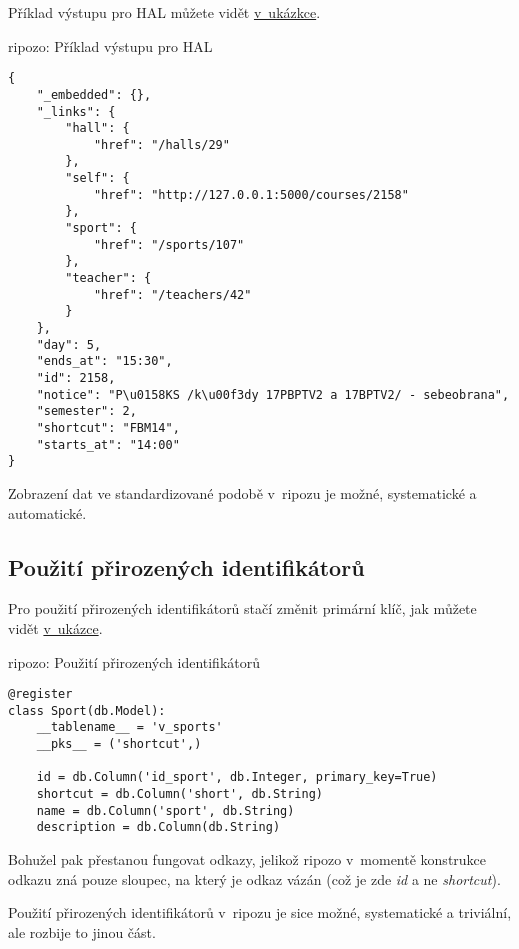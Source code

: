 Příklad výstupu pro HAL můžete vidět \protect\hyperlink{code:ripozo:hal}{v~ukázkce}.

\begin{listing}[htbp]
\caption{{\label{code:ripozo:hal}ripozo: Příklad výstupu pro HAL}}
\begin{verbatim}
{
    "_embedded": {},
    "_links": {
        "hall": {
            "href": "/halls/29"
        },
        "self": {
            "href": "http://127.0.0.1:5000/courses/2158"
        },
        "sport": {
            "href": "/sports/107"
        },
        "teacher": {
            "href": "/teachers/42"
        }
    },
    "day": 5,
    "ends_at": "15:30",
    "id": 2158,
    "notice": "P\u0158KS /k\u00f3dy 17PBPTV2 a 17BPTV2/ - sebeobrana",
    "semester": 2,
    "shortcut": "FBM14",
    "starts_at": "14:00"
}
\end{verbatim}
\end{listing}

Zobrazení dat ve standardizované podobě v~ripozu je možné, systematické a automatické.

\subsection{Použití přirozených identifikátorů}\label{pouux17eituxed-pux159irozenuxfdch-identifikuxe1torux16f}

Pro použití přirozených identifikátorů stačí změnit primární klíč, jak můžete vidět \protect\hyperlink{code:ripozo:ids}{v~ukázce}.

\begin{listing}[htbp]
\caption{{\label{code:ripozo:ids}ripozo: Použití přirozených identifikátorů}}
\begin{verbatim}
@register
class Sport(db.Model):
    __tablename__ = 'v_sports'
    __pks__ = ('shortcut',)

    id = db.Column('id_sport', db.Integer, primary_key=True)
    shortcut = db.Column('short', db.String)
    name = db.Column('sport', db.String)
    description = db.Column(db.String)
\end{verbatim}
\end{listing}

Bohužel pak přestanou fungovat odkazy, jelikož ripozo v~momentě konstrukce odkazu zná pouze sloupec, na který je odkaz vázán (což je zde \emph{id} a ne \emph{shortcut}).

Použití přirozených identifikátorů v~ripozu je sice možné, systematické a triviální, ale rozbije to jinou část.

